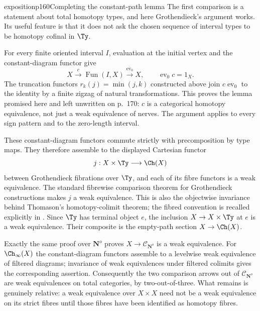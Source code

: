 \begin{dcomment}{exposition}{p160}{Completing the constant-path lemma}
The first comparison is a statement about total homotopy types, and here Grothendieck's argument works. Its useful feature is that it does not ask the chosen sequence of interval types to be homotopy cofinal in $\Ty$.

For every finite oriented interval $I$, evaluation at the initial vertex and the constant-diagram functor give
\[
 X\xrightarrow{c}\operatorname{Fun}(I,X)
 \xrightarrow{\operatorname{ev}_0}X,
 \qquad \operatorname{ev}_0c=1_X.
\]
The truncation functors $r_k(j)=\min(j,k)$ constructed above join $c\operatorname{ev}_0$ to the identity by a finite zigzag of natural transformations. This proves the lemma promised here and left unwritten on p.~170: $c$ is a categorical homotopy equivalence, not just a weak equivalence of nerves. The argument applies to every sign pattern and to the zero-length interval.

These constant-diagram functors commute strictly with precomposition by type maps. They therefore assemble to the displayed Cartesian functor
\[
 j:X\times\Ty\longrightarrow\Ch(X)
\]
between Grothendieck fibrations over $\Ty$, and each of its fibre functors is a weak equivalence. The standard fibrewise comparison theorem for Grothendieck constructions makes $j$ a weak equivalence. This is also the objectwise invariance behind Thomason's homotopy-colimit theorem; the fibred convention is recalled explicitly in \citet[\S1.5]{Shoikhet2016}. Since $\Ty$ has terminal object $e$, the inclusion $X\to X\times\Ty$ at $e$ is a weak equivalence. Their composite is the empty-path section $X\to\Ch(X)$.

Exactly the same proof over $\mathbf N^o$ proves $X\to\mathcal C_{\mathbf N^o}$ is a weak equivalence. For $\Ch_\infty(X)$ the constant-diagram functors assemble to a levelwise weak equivalence of filtered diagrams; invariance of weak equivalences under filtered colimits gives the corresponding assertion. Consequently the two comparison arrows out of $\mathcal C_{\mathbf N^o}$ are weak equivalences on total categories, by two-out-of-three. What remains is genuinely relative: a weak equivalence over $X\times X$ need not be a weak equivalence on its strict fibres until those fibres have been identified as homotopy fibres.
\end{dcomment}

